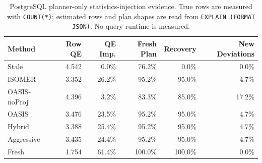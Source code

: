 \begin{table}[t]
  \centering
  \small
  \caption{PostgreSQL planner-only statistics-injection evidence. True rows are measured with \texttt{COUNT(*)}; estimated rows and plan shapes are read from \texttt{EXPLAIN (FORMAT JSON)}. No query runtime is measured.}
  \label{tab:postgres_planner_stats_injection}
  \setlength{\tabcolsep}{4pt}
  \begin{tabular}{lrrrrr}
    \toprule
    Method & Row QE & QE Imp. & Fresh Plan & Recovery & New Deviations \\
    \midrule
    Stale & 4.542 & 0.0\% & 76.2\% & 0.0\% & 0.0\% \\
    ISOMER & 3.352 & 26.2\% & 95.2\% & 95.0\% & 4.7\% \\
    OASIS-noProj & 4.396 & 3.2\% & 83.3\% & 85.0\% & 17.2\% \\
    OASIS & 3.476 & 23.5\% & 95.2\% & 95.0\% & 4.7\% \\
    Hybrid & 3.388 & 25.4\% & 95.2\% & 95.0\% & 4.7\% \\
    Aggressive & 3.435 & 24.4\% & 95.2\% & 95.0\% & 4.7\% \\
    Fresh & 1.754 & 61.4\% & 100.0\% & 100.0\% & 0.0\% \\
    \bottomrule
  \end{tabular}
\end{table}
